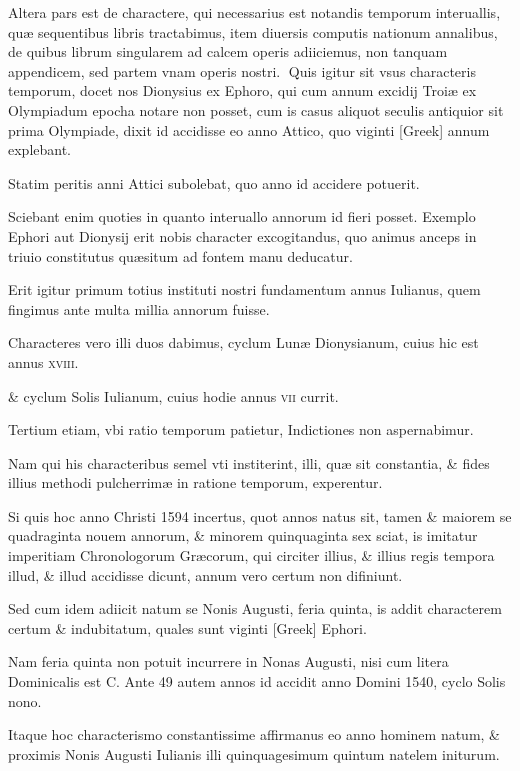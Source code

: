 \begin{parnumbers}

Altera pars est de charactere, qui necessarius est notandis temporum
interuallis, quæ sequentibus libris tractabimus, item diuersis
computis nationum annalibus, de quibus librum singularem ad calcem
operis adiiciemus, non tanquam appendicem, sed partem vnam
operis nostri.
Quis igitur sit vsus characteris temporum, docet nos Dionysius ex Ephoro, qui cum annum excidij Troiæ ex Olympiadum epocha notare non posset, cum is casus aliquot seculis antiquior sit prima Olympiade, dixit id accidisse eo anno Attico, quo viginti \textgreek{[Greek]} annum explebant.

Statim peritis anni Attici subolebat, quo anno id accidere potuerit.

Sciebant enim quoties in quanto interuallo annorum id fieri posset. Exemplo Ephori aut Dionysij erit nobis character excogitandus, quo animus anceps in triuio constitutus quæsitum ad fontem manu deducatur.

Erit igitur primum  totius instituti nostri fundamentum annus Iulianus, quem fingimus ante multa millia annorum fuisse.

Characteres vero illi duos dabimus, cyclum Lunæ Dionysianum, cuius hic est annus \textsc{xviii}.

\& cyclum Solis Iulianum, cuius hodie annus \textsc{vii} currit.

Tertium etiam, vbi ratio temporum patietur, Indictiones non aspernabimur.

Nam qui his characteribus semel vti institerint, illi, quæ sit constantia, \& fides illius methodi pulcherrimæ in ratione temporum, experentur.

Si quis hoc anno Christi 1594 incertus, quot annos natus sit, tamen \& maiorem se quadraginta nouem annorum, \& minorem quinquaginta sex sciat, is imitatur imperitiam Chronologorum Græcorum, qui circiter illius, \& illius regis tempora illud, \& illud accidisse dicunt, annum  vero certum non difiniunt.

Sed cum idem adiicit natum se Nonis Augusti, feria quinta, is addit characterem certum \& indubitatum, quales sunt viginti \textgreek{[Greek]} Ephori.

Nam feria quinta non potuit incurrere in Nonas Augusti, nisi cum litera Dominicalis est C. Ante 49 autem annos id accidit anno Domini 1540, cyclo Solis nono.

Itaque hoc characterismo constantissime affirmanus eo anno hominem natum, \& proximis Nonis Augusti Iulianis illi quinquagesimum quintum natelem initurum.


\end{parnumbers}
